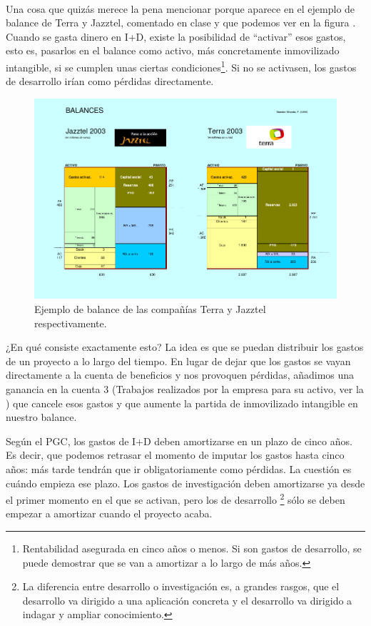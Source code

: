 \documentclass[nochap,palatino,shortheader]{apuntes}
\newcommand{\study}[1]{#1} \newcommand{\substudy}[1]{#1}
\begin{document}
\paragraph{} Una cosa que quizás merece la pena mencionar porque aparece en el ejemplo de balance de Terra y Jazztel, comentado en clase y que podemos ver en la figura . Cuando se gasta \substudy{dinero en I+D}, existe la posibilidad de ``\study{activar}'' esos gastos, esto es, \substudy{pasarlos en el balance como activo}, más concretamente \substudy{inmovilizado intangible}, si se cumplen unas ciertas condiciones\footnote{Rentabilidad asegurada en cinco años o menos. Si son gastos de desarrollo, se puede demostrar que se van a amortizar a lo largo de más años.}. \substudy{Si no} se activasen, los gastos de desarrollo \substudy{irían como pérdidas} directamente.

\begin{figure}[hbtp]
\centering
\includegraphics[width=\textwidth]{img/TerraJazztel.png}
\caption{Ejemplo de balance de las compañías Terra y Jazztel respectivamente.}
\label{fig:TerraJazztel}
\end{figure}

¿En qué consiste exactamente esto? La \study{idea} es que se puedan \study{distribuir los gastos} de un proyecto \study{a lo largo del tiempo}.
En lugar de dejar que los gastos se vayan directamente a la cuenta de beneficios y nos provoquen pérdidas, añadimos una ganancia en la cuenta 3 (Trabajos realizados por la empresa para su activo, ver la ) que cancele esos gastos y que aumente la partida de inmovilizado intangible en nuestro balance.

Según el PGC, los \substudy{gastos de I+D deben amortizarse en un plazo de cinco años}. Es decir, que podemos retrasar el momento de imputar los gastos hasta cinco años: más tarde tendrán que ir obligatoriamente como pérdidas.
La cuestión es cuándo empieza ese plazo.
Los gastos de investigación deben amortizarse ya desde el primer momento en el que se activan, pero los de \substudy{desarrollo}
\footnote{La diferencia entre desarrollo o investigación es, a grandes rasgos, que el \substudy{desarrollo} va dirigido a una \substudy{aplicación concreta} y el \substudy{desarrollo} va dirigido a \substudy{indagar y ampliar conocimiento}.}
sólo se deben empezar a \substudy{amortizar cuando el proyecto acaba}.
\end{document}
